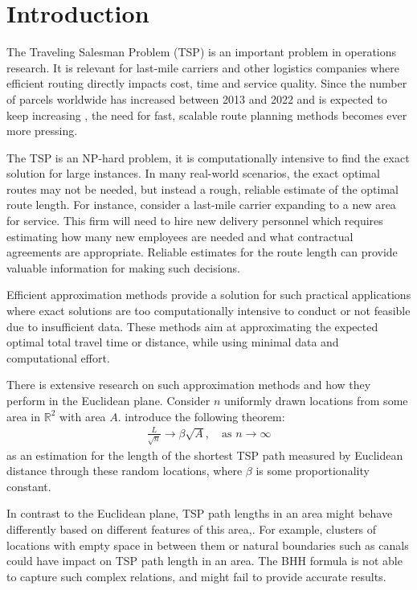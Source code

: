 \section{Introduction}
The Traveling Salesman Problem (TSP) is an important problem in operations research.
It is relevant for last-mile carriers and other logistics companies where efficient routing directly impacts cost, time and service quality.
Since the number of parcels worldwide has increased between 2013 and 2022 and is expected to keep increasing \citep{statista}, the need for fast, scalable route planning methods becomes ever more pressing.

The TSP is an NP-hard problem, it is computationally intensive to find the exact solution for large instances.
In many real-world scenarios, the exact optimal routes may not be needed, but instead a rough, reliable estimate of the optimal route length.
For instance, consider a last-mile carrier expanding to a new area for service.
This firm will need to hire new delivery personnel which requires estimating how many new employees are needed and what contractual agreements are appropriate.
Reliable estimates for the route length can provide valuable information for making such decisions.

Efficient approximation methods provide a solution for such practical applications where exact solutions are too computationally intensive to conduct or not feasible due to insufficient data.
These methods aim at approximating the expected optimal total travel time or distance, while using minimal data and computational effort.

There is extensive research on such approximation methods and how they perform in the Euclidean plane.
Consider $n$ uniformly drawn locations from some area in $\mathbb{R}^2$ with area $A$.
\citet{beardwood1959shortest} introduce the following theorem:
\begin{align}
	\frac{L}{\sqrt n} \to \beta \sqrt{A}, \quad \text{as } n \to \infty
	\label{eq:beardwood}
\end{align}
as an estimation for the length of the shortest TSP path measured by Euclidean distance through these random locations, where $\beta$ is some proportionality constant.

In contrast to the Euclidean plane, TSP path lengths in an area might behave differently based on different features of this area,.
For example, clusters of locations with empty space in between them or natural boundaries such as canals could have impact on TSP path length in an area.
The BHH formula is not able to capture such complex relations, and might fail to provide accurate results.

